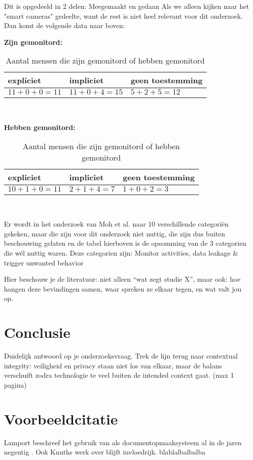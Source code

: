 \documentclass[nonacm,sigconf]{acmart}
\begin{document}
    Dit is opgedeeld in 2 delen: Meegemaakt en gedaan
    Als we alleen kijken naar het "smart cameras" gedeelte, want de rest is niet heel relevant voor dit onderzoek. Dan komt de volgende data naar boven:

    \begin{table}[h]
        \raggedright\textbf{Zijn gemonitord:}
        \begin{tabularx}{\columnwidth}{|X|X|X|}
            \hline
            expliciet & impliciet & geen toestemming\\
            \hline
            $11+0+0 = 11$ & $11+0+4 = 15$ & $5+2+5 = 12$\\
            \hline
        \end{tabularx}
        \vspace{0.01cm}
        \\
        \raggedright\textbf{Hebben gemonitord:}
        \begin{tabularx}{\columnwidth}{|X|X|X|}
            \hline
            expliciet & impliciet & geen toestemming\\
            \hline
            $10+1+0 = 11$ & $2+1+4 = 7$ & $1+0+2 = 3$\\
            \hline
        \end{tabularx}
        \vspace{0.01cm}
        \\
        \caption{Aantal mensen die zijn gemonitord of hebben gemonitord}
        \label{Tabel:1}
    \end{table}

    Er wordt in het onderzoek van Moh et al. naar 10 verschillende categoriën gekeken, maar die zijn voor dit onderzoek niet nuttig, die zijn dus buiten beschouwing gelaten en de tabel hierboven is de opsomming van de 3 categorien die wél nuttig waren.
    Deze categorien zijn: Monitor activities, data leakage & trigger unwanted behavior

    Hier beschouw je de literatuur: niet alleen “wat zegt studie X”, maar ook: hoe hangen deze bevindingen samen, waar spreken ze elkaar tegen, en wat valt jou op.

    \section{Conclusie}
    Duidelijk antwoord op je onderzoeksvraag.
    Trek de lijn terug naar contextual integrity: veiligheid en privacy staan niet los van elkaar, maar de balans verschuift zodra technologie te veel buiten de intended context gaat. (max 1 pagina)

    \section{Voorbeeldcitatie}
    Lamport beschreef het gebruik van als documentopmaaksysteem al in de jaren negentig \parencite{tabassum2023exploring}.
    Ook Knuths werk over blijft invloedrijk. \parencite{chaudhari2020smart}
    blablalbalbalba \parencite{kelly2023ring}

    \printbibliography

    \balance %
\end{document}
